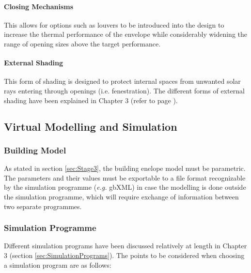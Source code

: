 \paragraph{Closing Mechanisms}\mbox{}

This allows for options such as louvers to be introduced into the design to increase the thermal performance of the envelope while considerably widening the range of opening sizes above the target performance.

\paragraph{External Shading}\mbox{}

This form of shading is designed to protect internal spaces from unwanted solar rays entering through openings (i.e. fenestration). The different forms of external shading have been explained in Chapter 3 (refer to page \pageref{Shading}).

\clearpage
\subsection{Virtual Modelling and Simulation}
\label{sec:SimulationModel}

\subsubsection{Building Model}

As stated in section \ref{sec:Stage3}, the building enelope model must be parametric. The parameters and their values must be exportable to a file format recognizable by the simulation programme (\emph{e.g.} gbXML) in case the modelling is done outside the simulation programme, which will require exchange of information between two separate programmes.

\subsubsection{Simulation Programme}
Different simulation programs have been discussed relatively at length in Chapter 3 (section \ref{sec:SimulationPrograms}). The points to be considered when choosing a simulation program are as follows:

